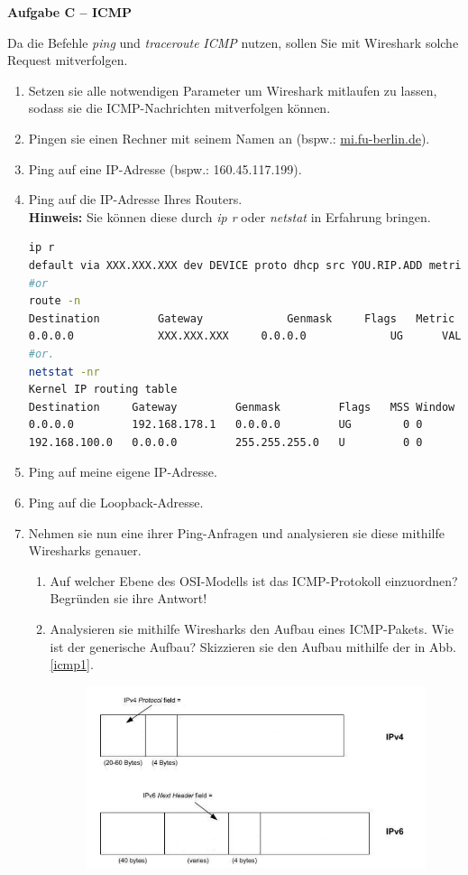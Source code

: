 \documentclass[paper=a4,fontsize=11pt]{scrartcl}%
\begin{document}
\begin{center}\Large{\textbf{Aufgabe C -- ICMP}}\end{center}\vskip0.2in
Da die Befehle \emph{ping} und \emph{traceroute} \emph{ICMP} nutzen, sollen Sie mit Wireshark solche Request mitverfolgen.
\begin{enumerate}
	\item Setzen sie alle notwendigen Parameter um Wireshark mitlaufen zu lassen, sodass sie die ICMP-Nachrichten mitverfolgen können.
	\item Pingen sie einen Rechner mit seinem Namen an (bspw.: \url{mi.fu-berlin.de}).
	\item Ping auf eine IP-Adresse (bspw.: 160.45.117.199).
	\item Ping auf die IP-Adresse Ihres Routers. \\\textbf{Hinweis:} Sie können diese durch \emph{ip r} oder \emph{netstat} in Erfahrung bringen. 
	\begin{lstlisting}[style=Bash, language=Bash]
ip r
default via XXX.XXX.XXX dev DEVICE proto dhcp src YOU.RIP.ADD metric VALUE
#or
route -n
Destination     	Gateway         	Genmask		Flags 	Metric 		Ref    	Use 	Iface
0.0.0.0          	XXX.XXX.XXX   	0.0.0.0         	UG    	VALUE    	0        	0 		DEVICE
#or.
netstat -nr
Kernel IP routing table
Destination     Gateway         Genmask         Flags   MSS Window  irtt Iface
0.0.0.0         192.168.178.1   0.0.0.0         UG        0 0          0 nm-bridge
192.168.100.0   0.0.0.0         255.255.255.0   U         0 0          0 virbr1
	\end{lstlisting}
	\item Ping auf meine eigene IP-Adresse.
	\item Ping auf die Loopback-Adresse.
	\item Nehmen sie nun eine ihrer Ping-Anfragen und analysieren sie diese mithilfe Wiresharks genauer.
	\begin{enumerate}
		\item Auf welcher Ebene des OSI-Modells ist das ICMP-Protokoll einzuordnen? Begründen sie ihre Antwort!
		\item Analysieren sie mithilfe Wiresharks den Aufbau eines ICMP-Pakets. Wie ist der generische Aufbau? Skizzieren sie den Aufbau mithilfe der in Abb. \ref{icmp1}.
		\begin{figure}[H]
		\centering
		\includegraphics[scale=0.5]{icmp1}

\end{figure}
\end{enumerate}
\end{enumerate}
\end{document}
